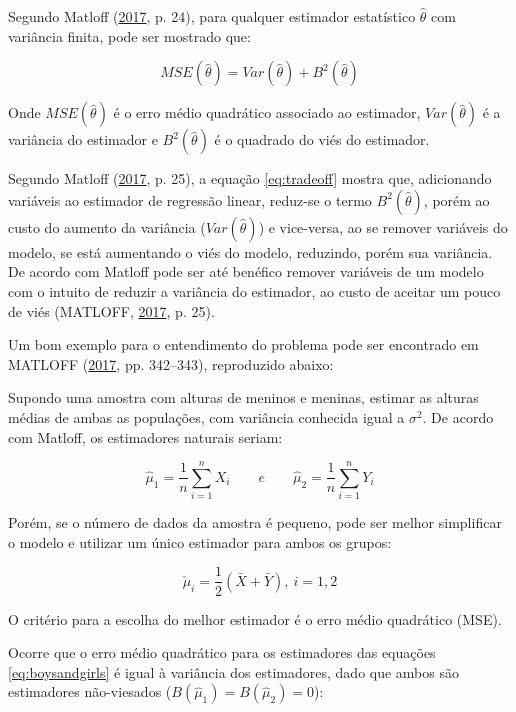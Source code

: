 \documentclass[
  a4paper, 11pt]{article}
\begin{document}
Segundo Matloff (\protect\hyperlink{ref-matloff2017}{2017}, p. 24), para
qualquer estimador estatístico \(\hat \theta\) com variância finita,
pode ser mostrado que:

\begin{equation} \label{eq:tradeoff}
MSE(\hat \theta) = Var(\hat \theta) + B^2(\hat \theta)
\end{equation}

Onde \(MSE(\hat\theta)\) é o erro médio quadrático associado ao
estimador, \(Var(\hat\theta)\) é a variância do estimador e
\(B^2(\hat\theta)\) é o quadrado do viés do estimador.

Segundo Matloff (\protect\hyperlink{ref-matloff2017}{2017}, p. 25), a
equação \ref{eq:tradeoff} mostra que, adicionando variáveis ao estimador
de regressão linear, reduz-se o termo \(B^2(\hat \theta)\), porém ao
custo do aumento da variância (\(Var(\hat\theta)\)) e vice-versa, ao se
remover variáveis do modelo, se está aumentando o viés do modelo,
reduzindo, porém sua variância. De acordo com Matloff pode ser até
benéfico remover variáveis de um modelo com o intuito de reduzir a
variância do estimador, ao custo de aceitar um pouco de viés (MATLOFF,
\protect\hyperlink{ref-matloff2017}{2017}, p. 25).

Um bom exemplo para o entendimento do problema pode ser encontrado em
MATLOFF (\protect\hyperlink{ref-matloff2017}{2017}, pp. 342--343),
reproduzido abaixo:

Supondo uma amostra com alturas de meninos e meninas, estimar as alturas
médias de ambas as populações, com variância conhecida igual a
\(\sigma^2\). De acordo com Matloff, os estimadores naturais seriam:

\begin{equation} \label{eq:boysandgirls}
\hat\mu_1 = \frac{1}{n}\sum_{i=1}^{n}X_i \qquad e \qquad \hat\mu_2 = \frac{1}{n}\sum_{i=1}^{n}Y_i
\end{equation}

Porém, se o número de dados da amostra é pequeno, pode ser melhor
simplificar o modelo e utilizar um único estimador para ambos os grupos:

\begin{equation} \label{eq:all}
\check \mu_i = \frac{1}{2}(\bar X + \bar Y), \ i = 1,2
\end{equation}

O critério para a escolha do melhor estimador é o erro médio quadrático
(MSE).

Ocorre que o erro médio quadrático para os estimadores das equações
\ref{eq:boysandgirls} é igual à variância dos estimadores, dado que
ambos são estimadores não-viesados
(\(B(\hat \mu_1) = B(\hat \mu_2) = 0\)):
\end{document}
